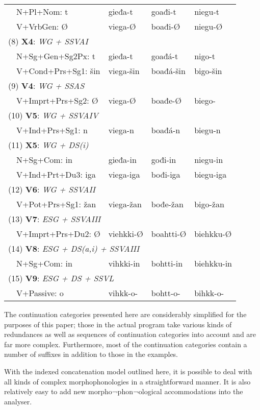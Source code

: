 \documentclass[a4paper,english]{article}
\begin{document}
\begin{table}[htdp]
\begin{center}
\begin{tabular}{lllll}
  & N+Pl+Nom: t & gieđa-t & goađi-t & niegu-t\\ 
  & V+VrbGen: Ø & viega-Ø & boađi-Ø & niegu-Ø\\ 
\multicolumn{4}{l}{(8) \textbf{X4}: \textit{WG + SSVAI}}\\ 
  & N+Sg+Gen+Sg2Px: t & gieđa-t & goađá-t & nigo-t\\ 
  & V+Cond+Prs+Sg1: šin & viega-šin & boađá-šin & bigo-šin\\ 
\multicolumn{4}{l}{(9) \textbf{V4}: \textit{WG + SSAS}}\\ 
  & V+Imprt+Prs+Sg2: Ø & viega-Ø & boađe-Ø & biego-\\ 
\multicolumn{4}{l}{(10) \textbf{V5}: \textit{WG +  SSVAIV}}\\ 
  & V+Ind+Prs+Sg1: n & viega-n & boađá-n & biegu-n\\ 
\multicolumn{4}{l}{(11) \textbf{X5}: \textit{WG + DS(i)}}\\ 
  & N+Sg+Com: in & gieđa-in & gođi-in & niegu-in\\ 
  & V+Ind+Prt+Du3: iga & viega-iga & bođi-iga & biegu-iga\\ 
\multicolumn{4}{l}{(12) \textbf{V6}: \textit{WG + SSVAII}}\\ 
  & V+Pot+Prs+Sg1: žan & viega-žan & bođe-žan & bigo-žan\\ 
\multicolumn{4}{l}{(13) \textbf{V7}: \textit{ESG + SSVAIII}}\\ 
  & V+Imprt+Prs+Du2: Ø & viehkki-Ø & boahtti-Ø & biehkku-Ø\\ 
\multicolumn{4}{l}{(14) \textbf{V8}: \textit{ESG + DS(a,i) + SSVAIII}}\\ 
  & N+Sg+Com: in & vihkki-in & bohtti-in & biehkku-in\\ 
\multicolumn{4}{l}{(15) \textbf{V9}: \textit{ESG + DS + SSVL}}\\ 
  & V+Passive: o & vihkk-o- & bohtt-o- & bihkk-o-
\end{tabular}
\end{center}
\label{stemvariants}
\end{table}%

The continuation categories presented here are considerably simplified for the purposes of this paper; those in the actual program take various kinds of redundances as well as sequences of continuation categories into account and are far more complex. Furthermore, most of the continuation categories contain a number of suffixes in addition to those in the examples.

With the indexed concatenation model outlined here, it is possible to deal with all kinds of complex morphophonologies in a straightforward manner. It is also relatively easy to add new morpho¬phon¬ological accommodations into the analyser.
\end{document}
